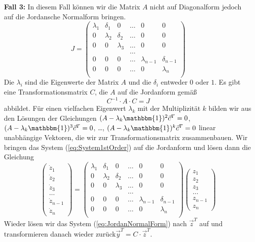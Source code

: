 \textbf{Fall 3: }In diesem Fall können wir die Matrix $A$ nicht auf
Diagonalform jedoch auf die Jordansche Normalform bringen.
\begin{equation*}
  J=\begin{pmatrix}
    \lambda_1&\delta_1&0&\dots&0&0\\
    0&\lambda_2&\delta_2&\dots&0&0\\
    0&0&\lambda_3&\dots&0&0\\
    &&&\dots&&\\
    0&0&0&\dots&\lambda_{n-1}&\delta_{n-1}\\
    0&0&0&\dots&0&\lambda_n\\
  \end{pmatrix}
\end{equation*}
Die $\lambda_i$ sind die Eigenwerte der Matrix $A$ und die $\delta_i$ entweder
$0$ oder $1$. Es gibt eine Transformationsmatrix $C$, die $A$ auf die
Jordanform gemäß \[ C^{-1}\cdot A\cdot C=J \] abbildet. Für einen vielfachen
Eigenwert $\lambda_k$ mit der Multiplizität $k$ bilden wir aus den Lösungen der
Gleichungen $(A - \lambda_k \mathbbm{1})^2 \vec{c}^T = 0$, $(A - \lambda_k
\mathbbm{1})^3\vec{c}^T = 0$, \dots, $(A - \lambda_k \mathbbm{1})^k \vec{c}^T =
0$ linear unabhängige Vektoren, die wir zur Transformationsmatrix
zusammenbauen. Wir bringen das System (\ref{eq:System1stOrder}) auf die Jordanform und lösen dann die Gleichung
\begin{equation}
  \begin{pmatrix}\dot{z}_1\\\dot{z}_2\\\dot{z}_3\\\dots\\\dot{z}_{n-1}\\\dot{z}_{n}\end{pmatrix}=
  \begin{pmatrix}
    \lambda_1&\delta_1&0&\dots&0&0\\
    0&\lambda_2&\delta_2&\dots&0&0\\
    0&0&\lambda_3&\dots&0&0\\
    &&&\dots&&\\
    0&0&0&\dots&\lambda_{n-1}&\delta_{n-1}\\
    0&0&0&\dots&0&\lambda_n\\
  \end{pmatrix}
  \begin{pmatrix}z_1\\z_2\\z_3\\\dots\\z_{n-1}\\z_{n}\end{pmatrix}
  \label{eq:JordanNormalForm} 
\end{equation}
Wieder lösen wir das System (\ref{eq:JordanNormalForm}) nach $\vec{z}^T$ auf
und transformieren danach wieder zurück\newline $\vec{y}^T=C\cdot\vec{z}^T$. 
